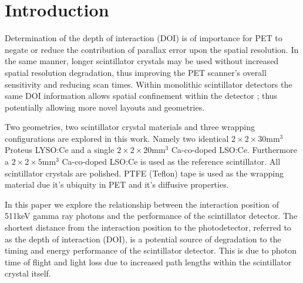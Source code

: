 \section{Introduction} 
Determination of the depth of interaction (DOI) is of importance for PET to negate or reduce the contribution of parallax error upon the spatial resolution\cite{Moses_2001}\cite{Humm_Rosenfeld_Del_Guerra_2003}. In the same manner, longer scintillator crystals may be used without increased spatial resolution degradation, thus improving the PET scanner's overall sensitivity and reducing scan times. Within monolithic scintillator detectors the same DOI information allows spatial confinement within the detector \cite{am_Borghi_Seifert_Schaart_2013}\cite{Maas_Bruyndonckx_Schaart_2012}; thus potentially allowing more novel\cite{Dendooven_Lohner_Beekman_2009}\cite{n_der_Lei_van_Dam_Schaart_2013} layouts and geometries.

Two geometries, two scintillator crystal materials and three wrapping configurations are explored in this work. Namely two identical $2\times2\times30$mm$^3$ Proteus LYSO:Ce and a single $2\times2\times20$mm$^3$ Ca-co-doped LSO:Ce. Furthermore a $2\times2\times5$mm$^3$ Ca-co-doped LSO:Ce is used as the reference scintillator. All scintillator crystals are polished. PTFE (Teflon) tape is used as the wrapping material due it's ubiquity in PET and it's diffusive properties.

In this paper we explore the relationship between the interaction position of 511keV gamma ray photons and the performance of the scintillator detector. The shortest distance from the interaction position to the photodetector, referred to as the depth of interaction (DOI), is a potential source of degradation to the timing and energy performance of the scintillator detector. This is due to photon time of flight and light loss due to increased path lengths within the scintillator crystal itself.

